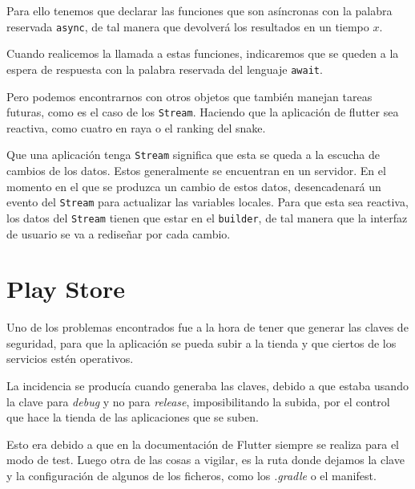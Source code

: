 Para ello tenemos que declarar las funciones que son asíncronas con la palabra reservada \texttt{async}, de tal manera que devolverá los resultados en un tiempo $x$.

Cuando realicemos la llamada a estas funciones, indicaremos que se queden a la espera de respuesta con la palabra reservada del lenguaje \texttt{await}.

Pero podemos encontrarnos con otros objetos que también manejan tareas futuras, como es el caso de los \texttt{Stream}. Haciendo que la aplicación de flutter sea reactiva, como cuatro en raya o el ranking del snake.

Que una aplicación tenga \texttt{Stream} significa que esta se queda a la escucha de cambios de los datos. Estos generalmente se encuentran en un servidor. En el momento en el que se produzca un cambio de estos datos, desencadenará un evento del \texttt{Stream} para actualizar las variables locales.
Para que esta sea reactiva, los datos del \texttt{Stream} tienen que estar en el \texttt{builder}, de tal manera que la interfaz de usuario se va a rediseñar por cada cambio.

%

\section{Play Store}
Uno de los problemas encontrados fue a la hora de tener que generar las claves de seguridad, para que la aplicación se pueda subir a la tienda y que ciertos de los servicios estén operativos.

La incidencia se producía cuando generaba las claves, debido a que estaba usando la clave para \emph{debug} y no para \emph{release}, imposibilitando la subida, por el control que hace la tienda de las aplicaciones que se suben.

Esto era debido a que en la documentación de Flutter siempre se realiza para el modo de test. Luego otra de las cosas a vigilar, es la ruta donde dejamos la clave y la configuración de algunos de los ficheros, como los \emph{.gradle} o el manifest.

